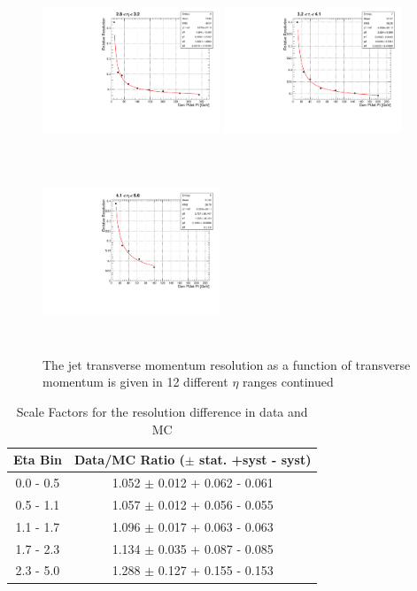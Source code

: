 \begin{figure}[!h]
  {\label{fig:fit2d}\includegraphics[width=5.3cm,height=5.3cm]{analysis_figs/eta9.pdf}} 
  {\label{fig:fit2e}\includegraphics[width=5.3cm,height=5.3cm]{analysis_figs/eta10.pdf}}
  {\label{fig:fit2f}\includegraphics[width=5.3cm,height=5.3cm]{analysis_figs/eta11.pdf}} 
 \caption{ The jet transverse momentum resolution as a function of transverse momentum is given in 12 different $\eta$ ranges continued}
 \label{fig:FIT2}
\end{figure}     

\begin{table}[!h]
\centering
 \caption{Scale Factors for the resolution difference in data and MC}
 \label{jet_table}         
 \begin{tabular}{|c|c|}
   \hline
   Eta Bin     &  Data/MC Ratio ($\pm$ stat. +syst - syst)\\ 
   \hline
   \hline
   0.0 - 0.5       & 1.052 $\pm$ 0.012 + 0.062 - 0.061 \\                        
   0.5 - 1.1     & 1.057 $\pm$ 0.012 + 0.056 - 0.055 \\                        
   1.1 - 1.7    & 1.096 $\pm$ 0.017 + 0.063 - 0.063 \\                        
   1.7 - 2.3     & 1.134 $\pm$ 0.035 + 0.087 - 0.085 \\                        
   2.3 - 5.0     & 1.288 $\pm$ 0.127 + 0.155 - 0.153 \\                        
\hline          
 \end{tabular}
\end{table}

